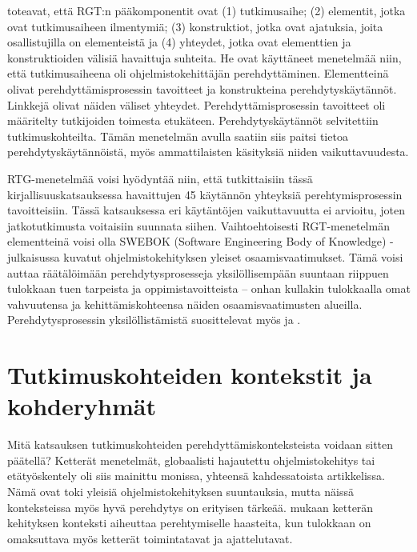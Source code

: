 \documentclass[utf8]{gradu3}
\begin{document}
\textcite{buchan-ym-2019} toteavat, että RGT:n pääkomponentit ovat (1) tutkimusaihe; (2) elementit, jotka ovat tutkimusaiheen ilmentymiä; (3) konstruktiot, jotka ovat ajatuksia, joita osallistujilla on elementeistä ja (4) yhteydet, jotka ovat elementtien ja konstruktioiden välisiä havaittuja suhteita. He ovat  käyttäneet menetelmää niin, että tutkimusaiheena oli ohjelmistokehittäjän perehdyttäminen. Elementteinä olivat perehdyttämisprosessin tavoitteet ja konstrukteina perehdytyskäytännöt. Linkkejä olivat näiden väliset yhteydet. Perehdyttämisprosessin tavoitteet oli määritelty tutkijoiden toimesta etukäteen. Perehdytyskäytännöt selvitettiin tutkimuskohteilta. Tämän menetelmän avulla saatiin siis paitsi tietoa perehdytyskäytännöistä, myös ammattilaisten käsityksiä niiden vaikuttavuudesta. 

RTG-menetelmää voisi hyödyntää niin, että tutkittaisiin tässä kirjallisuuskatsauksessa havaittujen 45 käytännön yhteyksiä perehtymisprosessin tavoitteisiin. Tässä katsauksessa eri käytäntöjen vaikuttavuutta ei arvioitu, joten jatkotutkimusta voitaisiin suunnata siihen. Vaihtoehtoisesti RGT-menetelmän elementteinä voisi olla SWEBOK (Software Engineering Body of Knowledge) -julkaisussa \parencite{swebok} kuvatut ohjelmistokehityksen yleiset osaamisvaatimukset. Tämä voisi auttaa räätälöimään perehdytysprosesseja yksilöllisempään suuntaan riippuen tulokkaan tuen tarpeista ja oppimistavoitteista -- onhan kullakin tulokkaalla omat vahvuutensa ja kehittämiskohteensa näiden osaamisvaatimusten alueilla. Perehdytysprosessin yksilöllistämistä suosittelevat myös \textcite{britto-ym-2017} ja \textcite{rodeghero-ym-2021}.

\section{Tutkimuskohteiden kontekstit ja kohderyhmät}

Mitä katsauksen tutkimuskohteiden perehdyttämiskonteksteista voidaan sitten päätellä? Ketterät menetelmät, globaalisti hajautettu ohjelmistokehitys tai etätyöskentely oli siis mainittu monissa, yhteensä kahdessatoista artikkelissa. Nämä ovat toki yleisiä ohjelmistokehityksen suuntauksia, mutta näissä konteksteissa myös hyvä perehdytys on erityisen tärkeää. \textcite{gregory-ym-2020} mukaan ketterän kehityksen konteksti aiheuttaa perehtymiselle haasteita, kun tulokkaan on omaksuttava myös ketterät toimintatavat ja ajattelutavat. 
\end{document}
